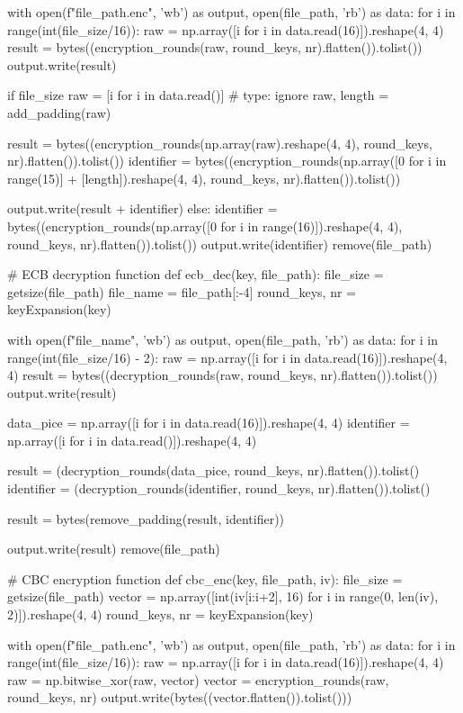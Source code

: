 \begin{python}
    with open(f"{file_path}.enc", 'wb') as output, open(file_path, 'rb') as data:
        for i in range(int(file_size/16)):
            raw = np.array([i for i in data.read(16)]).reshape(4, 4)
            result = bytes((encryption_rounds(raw, round_keys, nr).flatten()).tolist())
            output.write(result)

        if file_size %
            raw = [i for i in data.read()]  # type: ignore
            raw, length = add_padding(raw)

            result = bytes((encryption_rounds(np.array(raw).reshape(4, 4), round_keys, nr).flatten()).tolist())
            identifier = bytes((encryption_rounds(np.array([0 for i in range(15)] + [length]).reshape(4, 4), round_keys, nr).flatten()).tolist())

            output.write(result + identifier)
        else:
            identifier = bytes((encryption_rounds(np.array([0 for i in range(16)]).reshape(4, 4), round_keys, nr).flatten()).tolist())
            output.write(identifier)
    remove(file_path)


# ECB decryption function
def ecb_dec(key, file_path):
    file_size = getsize(file_path)
    file_name = file_path[:-4]
    round_keys, nr = keyExpansion(key)

    with open(f"{file_name}", 'wb') as output, open(file_path, 'rb') as data:
        for i in range(int(file_size/16) - 2):
            raw = np.array([i for i in data.read(16)]).reshape(4, 4)
            result = bytes((decryption_rounds(raw, round_keys, nr).flatten()).tolist())
            output.write(result)

        data_pice = np.array([i for i in data.read(16)]).reshape(4, 4)
        identifier = np.array([i for i in data.read()]).reshape(4, 4)

        result = (decryption_rounds(data_pice, round_keys, nr).flatten()).tolist()
        identifier = (decryption_rounds(identifier, round_keys, nr).flatten()).tolist()

        result = bytes(remove_padding(result, identifier))

        output.write(result)
    remove(file_path)


# CBC encryption function
def cbc_enc(key, file_path, iv):
    file_size = getsize(file_path)
    vector = np.array([int(iv[i:i+2], 16) for i in range(0, len(iv), 2)]).reshape(4, 4)
    round_keys, nr = keyExpansion(key)

    with open(f"{file_path}.enc", 'wb') as output, open(file_path, 'rb') as data:
        for i in range(int(file_size/16)):
            raw = np.array([i for i in data.read(16)]).reshape(4, 4)
            raw = np.bitwise_xor(raw, vector)
            vector = encryption_rounds(raw, round_keys, nr)
            output.write(bytes((vector.flatten()).tolist()))


\end{python}
